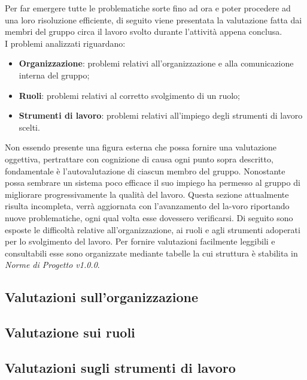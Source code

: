Per far emergere tutte le problematiche sorte fino ad ora e poter procedere 
ad una loro risoluzione efficiente, di seguito viene presentata la valutazione 
fatta dai membri del gruppo {\Gruppo} circa il lavoro svolto durante l’attività appena conclusa. \\
I problemi analizzati riguardano:

\begin{itemize}
	\item \textbf{Organizzazione}: problemi relativi all’organizzazione e alla comunicazione interna del gruppo;
	\item \textbf{Ruoli}: problemi relativi al corretto svolgimento di un ruolo;
	\item \textbf{Strumenti di lavoro}: problemi relativi all’impiego degli strumenti di lavoro scelti.
\end{itemize}

Non essendo presente una figura esterna che possa fornire una valutazione oggettiva, pertrattare con cognizione 
di causa ogni punto sopra descritto, fondamentale è l’autovalutazione di ciascun membro del gruppo. Nonostante possa 
sembrare un sistema poco efficace il suo impiego ha permesso al gruppo di migliorare progressivamente la qualità del lavoro. 
Questa sezione attualmente risulta incompleta, verrà aggiornata con l’avanzamento del la-voro riportando nuove problematiche, 
ogni qual volta esse dovessero verificarsi. Di seguito sono esposte le difficoltà relative all’organizzazione, ai ruoli e agli strumenti 
adoperati per lo svolgimento del lavoro. Per fornire valutazioni facilmente leggibili e consultabili esse sono organizzate mediante tabelle 
la cui struttura è stabilita in \textit{Norme di Progetto v1.0.0}. 

\subsection{Valutazioni sull'organizzazione}


\subsection{Valutazione sui ruoli}


\subsection{Valutazioni sugli strumenti di lavoro}
